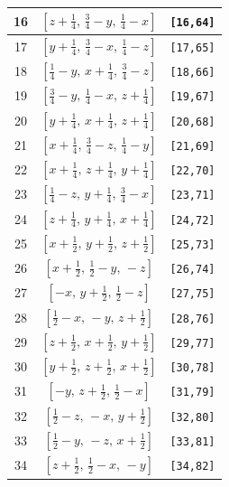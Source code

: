 \documentclass[fleqn,8pt]{jsarticle}
\begin{document}
\begin{longtable}{ccc}
16 & $\left[ z + \frac{1}{4},\, \frac{3}{4} - y,\, \frac{1}{4} - x \right]$ & {\tt [16,64]} \\ \hline
17 & $\left[ y + \frac{1}{4},\, \frac{3}{4} - x,\, \frac{1}{4} - z \right]$ & {\tt [17,65]} \\ \hline
18 & $\left[ \frac{1}{4} - y,\, x + \frac{1}{4},\, \frac{3}{4} - z \right]$ & {\tt [18,66]} \\ \hline
19 & $\left[ \frac{3}{4} - y,\, \frac{1}{4} - x,\, z + \frac{1}{4} \right]$ & {\tt [19,67]} \\ \hline
20 & $\left[ y + \frac{1}{4},\, x + \frac{1}{4},\, z + \frac{1}{4} \right]$ & {\tt [20,68]} \\ \hline
21 & $\left[ x + \frac{1}{4},\, \frac{3}{4} - z,\, \frac{1}{4} - y \right]$ & {\tt [21,69]} \\ \hline
22 & $\left[ x + \frac{1}{4},\, z + \frac{1}{4},\, y + \frac{1}{4} \right]$ & {\tt [22,70]} \\ \hline
23 & $\left[ \frac{1}{4} - z,\, y + \frac{1}{4},\, \frac{3}{4} - x \right]$ & {\tt [23,71]} \\ \hline
24 & $\left[ z + \frac{1}{4},\, y + \frac{1}{4},\, x + \frac{1}{4} \right]$ & {\tt [24,72]} \\ \hline
25 & $\left[ x + \frac{1}{2},\, y + \frac{1}{2},\, z + \frac{1}{2} \right]$ & {\tt [25,73]} \\ \hline
26 & $\left[ x + \frac{1}{2},\, \frac{1}{2} - y,\, - z \right]$ & {\tt [26,74]} \\ \hline
27 & $\left[ - x,\, y + \frac{1}{2},\, \frac{1}{2} - z \right]$ & {\tt [27,75]} \\ \hline
28 & $\left[ \frac{1}{2} - x,\, - y,\, z + \frac{1}{2} \right]$ & {\tt [28,76]} \\ \hline
29 & $\left[ z + \frac{1}{2},\, x + \frac{1}{2},\, y + \frac{1}{2} \right]$ & {\tt [29,77]} \\ \hline
30 & $\left[ y + \frac{1}{2},\, z + \frac{1}{2},\, x + \frac{1}{2} \right]$ & {\tt [30,78]} \\ \hline
31 & $\left[ - y,\, z + \frac{1}{2},\, \frac{1}{2} - x \right]$ & {\tt [31,79]} \\ \hline
32 & $\left[ \frac{1}{2} - z,\, - x,\, y + \frac{1}{2} \right]$ & {\tt [32,80]} \\ \hline
33 & $\left[ \frac{1}{2} - y,\, - z,\, x + \frac{1}{2} \right]$ & {\tt [33,81]} \\ \hline
34 & $\left[ z + \frac{1}{2},\, \frac{1}{2} - x,\, - y \right]$ & {\tt [34,82]} \\ \hline

\end{longtable}
\end{document}
